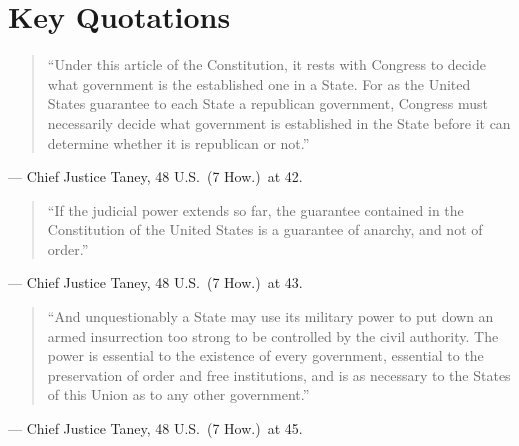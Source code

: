 \documentclass[12pt]{article}
\begin{document}
\section{Key Quotations}

\begin{quote}
``Under this article of the Constitution, it rests with Congress to decide what government is the established one in a State. For as the United States guarantee to each State a republican government, Congress must necessarily decide what government is established in the State before it can determine whether it is republican or not.''
\end{quote}
\noindent --- Chief Justice Taney, 48 U.S.\ (7 How.)\ at 42.

\begin{quote}
``If the judicial power extends so far, the guarantee contained in the Constitution of the United States is a guarantee of anarchy, and not of order.''
\end{quote}
\noindent --- Chief Justice Taney, 48 U.S.\ (7 How.)\ at 43.

\begin{quote}
``And unquestionably a State may use its military power to put down an armed insurrection too strong to be controlled by the civil authority. The power is essential to the existence of every government, essential to the preservation of order and free institutions, and is as necessary to the States of this Union as to any other government.''
\end{quote}
\noindent --- Chief Justice Taney, 48 U.S.\ (7 How.)\ at 45.
\end{document}
